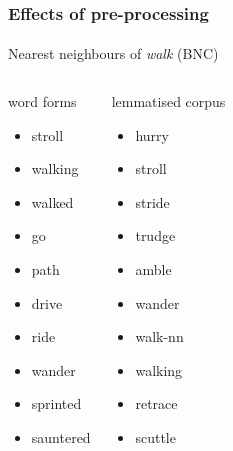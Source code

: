 \documentclass[t]{beamer} %
\begin{document}
\begin{frame}
  \frametitle{Effects of pre-processing}
  \framesubtitle{}

  \centering
  Nearest neighbours of \emph{walk} (BNC)
  \footnotesize
  \begin{columns}[t]
    \column{4cm}
    \begin{block}{word forms}
      \begin{itemize}
      \item stroll
      \item walking
      \item walked
      \item go
      \item path
      \item drive
      \item ride
      \item wander
      \item sprinted
      \item sauntered
      \end{itemize}
    \end{block}
    \column{4cm}
    \begin{block}{lemmatised corpus}
      \begin{itemize}
      \item hurry
      \item stroll
      \item stride
      \item trudge
      \item amble
      \item wander
      \item walk-nn
      \item walking
      \item retrace
      \item scuttle 
      \end{itemize}
    \end{block}
  \end{columns}
\end{frame}
\end{document}

